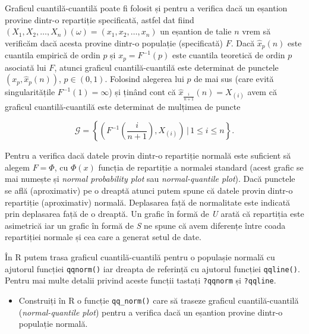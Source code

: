 \documentclass[]{article}
\newenvironment{frshaded*}{%
  \def\FrameCommand{\fboxrule=\FrameRule\fboxsep=\FrameSep \fcolorbox{framecolor}{shadecolor1}}%
  \MakeFramed {\advance\hsize-\width \FrameRestore}}%
{\endMakeFramed}
\newenvironment{rmdblock}[1]
  {\begin{frshaded*}
  \begin{itemize}
  \renewcommand{\labelitemi}{
    \raisebox{-.7\height}[0pt][0pt]{
      {\setkeys{Gin}{width=2em,keepaspectratio}\texttt{[image: images/icons/\#1]}}
    }
  }
  \item
  }
  {
  \end{itemize}
  \end{frshaded*}
  }
\newenvironment{rmdexercise}
  {\begin{rmdblock}{exercise}}
  {\end{rmdblock}}
\begin{document}
Graficul cuantilă-cuantilă poate fi folosit și pentru a verifica dacă un
eșantion provine dintr-o repartiție specificată, astfel dat fiind
\((X_1, X_2, \ldots, X_n)(\omega) = (x_1, x_2, \ldots, x_n)\) un
eșantion de talie \(n\) vrem să verificăm dacă acesta provine dintr-o
populație (specificată) \(F\). Dacă \(\hat{x}_p(n)\) este cuantila
empirică de ordin \(p\) și \(x_p = F^{-1}(p)\) este cuantila teoretică
de ordin \(p\) asociată lui \(F\), atunci graficul cuantilă-cuantilă
este determinat de punctele \(\left(x_p,\hat{x}_p(n)\right)\),
\(p\in(0,1)\). Folosind alegerea lui \(p\) de mai sus (care evită
singularitățile \(F^{-1}(1) = \infty\)) și ținând cont că
\(\hat{x}_{\frac{i}{n+1}}(n) = X_{(i)}\) avem că graficul
cuantilă-cuantilă este determinat de mulțimea de puncte

\[
  \mathcal{G} = \left\{\left(F^{-1}\left(\frac{i}{n+1}\right), X_{(i)}\right)\,|\, 1\leq i\leq n\right\}. 
\]

Pentru a verifica dacă datele provin dintr-o repartiție normală este
suficient să alegem \(F = \Phi\), cu \(\Phi(x)\) funcția de repartiție a
normalei standard (acest grafic se mai numește și \emph{normal
probability plot} sau \emph{normal-quantile plot}). Dacă punctele se
află (aproximativ) pe o dreaptă atunci putem spune că datele provin
dintr-o repartiție (aproximativ) normală. Deplasarea față de normalitate
este indicată prin deplasarea față de o dreaptă. Un grafic în formă de
\emph{U} arată că repartiția este asimetrică iar un grafic în formă de
\emph{S} ne spune că avem diferențe între coada repartiției normale și
cea care a generat setul de date.

În R putem trasa graficul cuantilă-cuantilă pentru o populașie normală
cu ajutorul funcției \texttt{qqnorm()} iar dreapta de referință cu
ajutorul funcției \texttt{qqline()}. Pentru mai multe detalii privind
aceste funcții tastați \texttt{?qqnorm} și \texttt{?qqline}.

\begin{rmdexercise}
Construiți în R o funcție \texttt{qq\_norm()} care să traseze graficul
cuantilă-cuantilă (\emph{normal-quantile plot}) pentru a verifica dacă
un eșantion provine dintr-o populație normală.
\end{rmdexercise}
\end{document}
